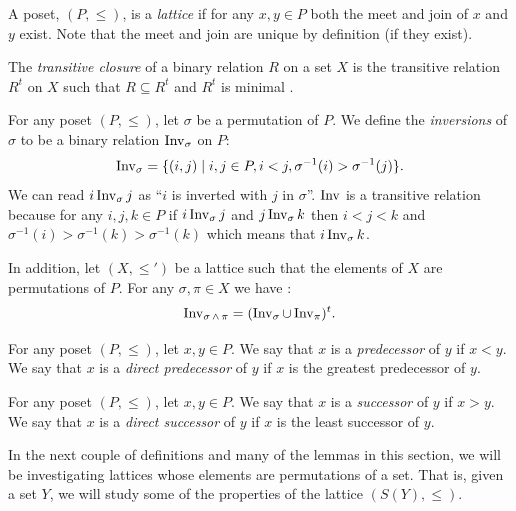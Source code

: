 	\begin{definition}
		\label{lattice-definition}
		A poset, $(P, \le)$, is a \emph{lattice} if for any $x, y \in P$ both the meet and join of $x$ and $y$ exist. Note that the meet and join are unique by definition (if they exist).
	\end{definition}

	\begin{definition}
		The \emph{transitive closure} of a binary relation $R$ on a set $X$ is the transitive relation $R^t$ on $X$ such that $R \subseteq R^t$ and $R^t$ is minimal \cite[p. 337]{lidl1998applied}.
	\end{definition}

	\begin{definition}
		For any poset $(P, \le)$, let $\sigma$ be a permutation of $P$. We define the \emph{inversions} of $\sigma$ to be a binary relation $\operatorname{Inv}_{\sigma}$ on $P$:
		\[
			\operatorname{Inv}_{\sigma} = \{(i,j) \mid i, j \in P, i < j, \sigma^{-1}(i) > \sigma^{-1}(j)\}.
		\]
		We can read $i \operatorname{Inv}_{\sigma} j$ as ``$i$ is inverted with $j$ in $\sigma$''. $\operatorname{Inv}$ is a transitive relation because for any $i,j,k \in P$ if $i \operatorname{Inv}_{\sigma} j$ and $j \operatorname{Inv}_{\sigma} k$ then $i < j < k$ and $\sigma^{-1}(i) > \sigma^{-1}(k) > \sigma^{-1}(k)$ which means that $i \operatorname{Inv}_{\sigma} k$.

		In addition, let $(X, \le')$ be a lattice such that the elements of $X$ are permutations of $P$. For any $\sigma, \pi \in X$ we have \cite{markowsky1994permutation}:
		\[
			\operatorname{Inv}_{\sigma \operatorname{\wedge} \pi} = (\operatorname{Inv}_{\sigma} \cup \operatorname{Inv}_{\pi})^t.
		\]
	\end{definition}

	\begin{definition}
		For any poset $(P, \le)$, let $x,y \in P$. We say that $x$ is a \emph{predecessor} of $y$ if $x < y$. We say that $x$ is a \emph{direct predecessor} of $y$ if $x$ is the greatest predecessor of $y$.
	\end{definition}

	\begin{definition}
		For any poset $(P, \le)$, let $x,y \in P$. We say that $x$ is a \emph{successor} of $y$ if $x > y$. We say that $x$ is a \emph{direct successor} of $y$ if $x$ is the least successor of $y$.
	\end{definition}

	In the next couple of definitions and many of the lemmas in this section, we will be investigating lattices whose elements are permutations of a set. That is, given a set $Y$, we will study some of the properties of the lattice $(S(Y), \le)$.

